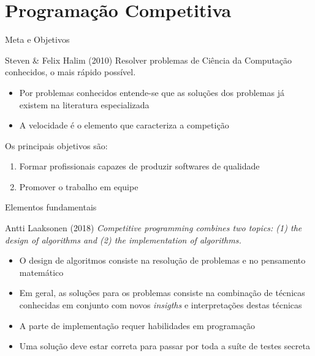 \section{Programação Competitiva}

\begin{frame}[fragile]{Meta e Objetivos}

    \begin{block}{Steven \& Felix Halim (2010)}
    Resolver problemas de Ciência da Computação conhecidos, o mais rápido possível.
    \end{block}

    \begin{itemize}
        \item Por problemas conhecidos entende-se que as soluções dos problemas já existem 
        na literatura especializada
        \item A velocidade é o elemento que caracteriza a competição
    \end{itemize}

    Os principais objetivos são:

    \begin{enumerate}
        \item Formar profissionais capazes de produzir softwares de qualidade
        \item Promover o trabalho em equipe
    \end{enumerate}

\end{frame}


\begin{frame}[fragile]{Elementos fundamentais}

    \begin{block}{Antti Laaksonen (2018)}
    \textit{Competitive programming combines two topics: (1) the design of algorithms and
    (2) the implementation of algorithms.}
    \end{block}

    \begin{itemize}
        \item O design de algoritmos consiste na resolução de problemas e no pensamento
        matemático
        \item Em geral, as soluções para os problemas consiste na combinação de técnicas
        conhecidas em conjunto com novos \textit{insigths} e interpretações destas técnicas
        \item A parte de implementação requer habilidades em programação
        \item Uma solução deve estar correta para passar por toda a suíte de testes secreta
    \end{itemize}

\end{frame}
